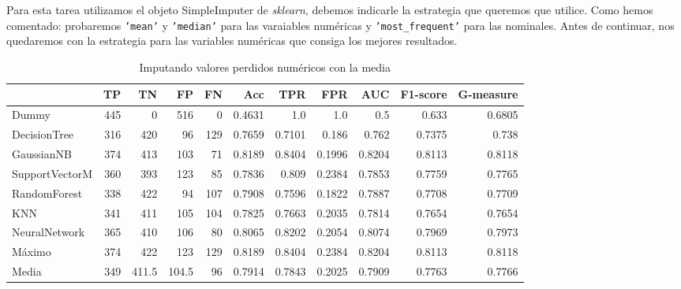 \documentclass{article}
\begin{document}
Para esta tarea utilizamos el objeto SimpleImputer de
\textit{sklearn}, debemos indicarle la estrategia que queremos que
utilice. Como hemos comentado: probaremos \texttt{'mean'} y
\texttt{'median'} para las varaiables numéricas y
\texttt{'most\_frequent'} para las nominales. Antes de continuar, nos
quedaremos con la estrategia para las variables numéricas que consiga
los mejores resultados.

\begin{table}[H]
\centering
\caption{Imputando valores perdidos numéricos con la media}
\label{tab:impute-mean}
\begin{tabular}{|lrrrrrrrrrr|}
\hline
 & TP & TN & FP & FN & Acc & TPR & FPR & AUC & F1-score & G-measure\\ \hline
Dummy & 445 & 0 & 516 & 0 & 0.4631 & 1.0 & 1.0 & 0.5 & 0.633 & 0.6805\\
DecisionTree & 316 & 420 & 96 & 129 & 0.7659 & 0.7101 & 0.186 & 0.762 & 0.7375 & 0.738\\
GaussianNB & 374 & 413 & 103 & 71 & 0.8189 & 0.8404 & 0.1996 & 0.8204 & 0.8113 & 0.8118\\
SupportVectorM & 360 & 393 & 123 & 85 & 0.7836 & 0.809 & 0.2384 & 0.7853 & 0.7759 & 0.7765\\
RandomForest & 338 & 422 & 94 & 107 & 0.7908 & 0.7596 & 0.1822 & 0.7887 & 0.7708 & 0.7709\\
KNN & 341 & 411 & 105 & 104 & 0.7825 & 0.7663 & 0.2035 & 0.7814 & 0.7654 & 0.7654\\
NeuralNetwork & 365 & 410 & 106 & 80 & 0.8065 & 0.8202 & 0.2054 & 0.8074 & 0.7969 & 0.7973\\ \hline
Máximo & 374 & 422 & 123 & 129 & 0.8189 & 0.8404 & 0.2384 & 0.8204 & 0.8113 & 0.8118\\
Media & 349 & 411.5 & 104.5 & 96 & 0.7914 & 0.7843 & 0.2025 & 0.7909 & 0.7763 & 0.7766\\
\hline
\end{tabular}
\end{table}
\end{document}
